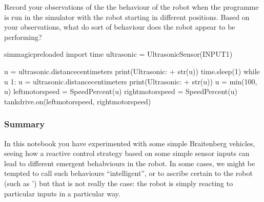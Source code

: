 \documentclass[letterpaper,10pt,english]{sphinxmanual}
\begin{document}
Record your observations of the the behaviour of the robot when the programme is run in the simulator with the robot starting in different positions. Based on your observations, what do sort of behaviour does the robot appear to be performing?

{
\begin{sphinxVerbatim}[commandchars=\\\{\}]
\llap{\color{nbsphinxin}[ ]:\,\hspace{\fboxrule}\hspace{\fboxsep}}\PYGZpc{}\PYGZpc{}sim\PYGZus{}magic\PYGZus{}preloaded
import time
ultrasonic = UltrasonicSensor(INPUT\PYGZus{}1)

u = ultrasonic.distance\PYGZus{}centimeters
print(\PYGZsq{}Ultrasonic: \PYGZsq{} + str(u))
time.sleep(1)
while  u \PYGZgt{} 1:
    u = ultrasonic.distance\PYGZus{}centimeters
    print(\PYGZsq{}Ultrasonic: \PYGZsq{} + str(u))
    u = min(100, u)
    left\PYGZus{}motor\PYGZus{}speed = SpeedPercent(u)
    right\PYGZus{}motor\PYGZus{}speed = SpeedPercent(u)
    tank\PYGZus{}drive.on(left\PYGZus{}motor\PYGZus{}speed, right\PYGZus{}motor\PYGZus{}speed)

\end{sphinxVerbatim}
}







\subsubsection{Summary}
\label{\detokenize{content/03_Robot_Lab/Section_00_03:Summary}}
In this notebook you have experimented with some simple Braitenberg vehicles, seeing how a reactive control strategy based on some simple sensor inputs can lead to different emergent behabviours in the robot. In some cases, we might be tempted to call such behaviours “intelligent”, or to ascribe certain  to the robot (such as ’) but that is not really the case: the robot is simply reacting to particular inputs in a particular way.
\end{document}
